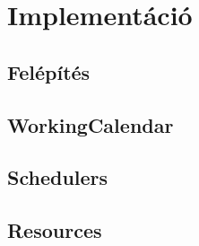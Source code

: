 \chapter{Implementáció}\label{sect:Implement}
\section{Felépítés}

\section{WorkingCalendar}

\section{Schedulers}

\section{Resources}
